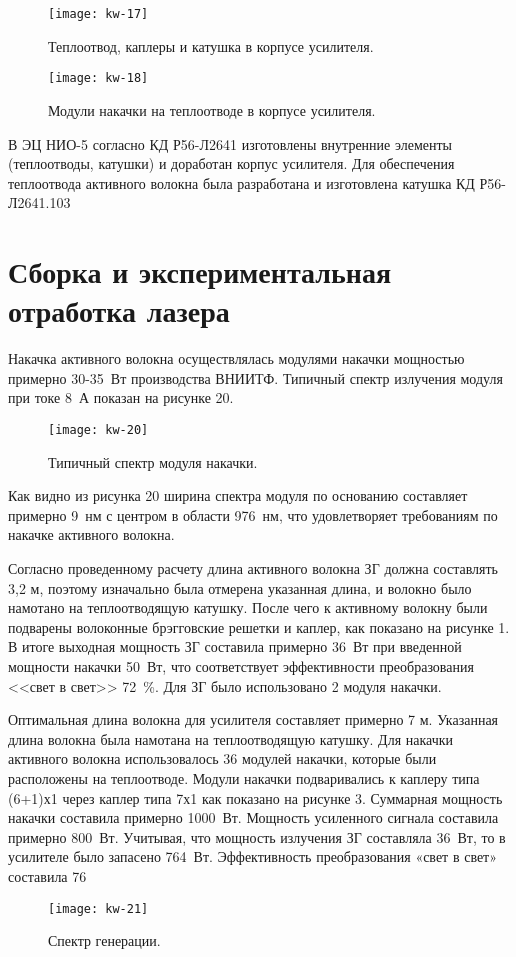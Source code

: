 \begin{figure}
  \centering
  \texttt{[image: kw-17]}
  \caption{Теплоотвод, каплеры и катушка в корпусе усилителя.}
  \label{img:kw-17}
\end{figure}
\begin{figure}
  \centering
  \texttt{[image: kw-18]}
  \caption{Модули накачки на теплоотводе в корпусе усилителя.}
  \label{img:kw-18}
\end{figure}

В ЭЦ НИО-5 согласно КД Р56-Л2641 изготовлены внутренние элементы (теплоотводы, катушки) и доработан корпус усилителя. Для обеспечения теплоотвода активного волокна была разработана и изготовлена катушка КД Р56-Л2641.103

\section{Сборка и экспериментальная отработка лазера}
\label{sec:kw-assembly}

Накачка активного волокна осуществлялась модулями накачки мощностью примерно 30-35~Вт производства ВНИИТФ. Типичный спектр излучения модуля при токе 8~А показан на рисунке 20.
\begin{figure}
  \centering
  \texttt{[image: kw-20]}
  \caption{Типичный спектр модуля накачки.}
  \label{img:kw-20}
\end{figure}

Как видно из рисунка 20 ширина спектра модуля по основанию составляет примерно 9~нм с центром в области 976~нм, что удовлетворяет требованиям по накачке активного волокна.

Согласно проведенному расчету длина активного волокна ЗГ должна составлять 3,2 м, поэтому изначально была отмерена указанная длина, и волокно было намотано на теплоотводящую катушку. После чего к активному волокну были подварены волоконные брэгговские решетки и каплер, как показано на рисунке 1. В итоге выходная мощность ЗГ составила примерно 36~Вт при введенной мощности накачки 50~Вт, что соответствует эффективности преобразования <<свет в свет>> 72~\%. Для ЗГ было использовано 2 модуля накачки.

Оптимальная длина волокна для усилителя составляет примерно 7 м. Указанная длина волокна была намотана на теплоотводящую катушку. Для накачки активного волокна использовалось 36 модулей накачки, которые были расположены на теплоотводе. Модули накачки подваривались к каплеру  типа (6+1)х1 через каплер типа 7х1 как показано на рисунке 3. Суммарная мощность накачки составила примерно 1000~Вт. Мощность усиленного сигнала составила примерно 800~Вт. Учитывая, что мощность излучения ЗГ составляла 36~Вт, то в усилителе было запасено 764~Вт. Эффективность преобразования «свет в свет» составила 76%
\begin{figure}
  \centering
  \texttt{[image: kw-21]}
  \caption{Спектр генерации.}
  \label{img:kw-21}
\end{figure}

